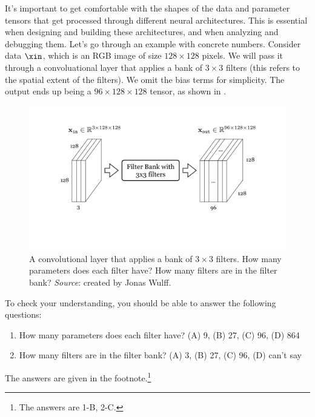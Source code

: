 It's important to get comfortable with the shapes of the data and parameter tensors that get processed through different neural architectures. This is essential when designing and building these architectures, and when analyzing and debugging them. Let's go through an example with concrete numbers. Consider data $\xin$, which is an RGB image of size $128 \times 128$ pixels. We will pass it through a convoluational layer that applies a bank of $3 \times 3$ filters (this refers to the spatial extent of the filters). We omit the bias terms for simplicity. The output ends up being a $96 \times 128 \times 128$ tensor, as shown in \fig{\ref{fig:convolutional_neural_nets:multichannel_conv_diagram}}.
\begin{figure}[h]
\centerline{
    \includegraphics[width=0.65\linewidth]{./figures/convolutional_neural_nets/multichannel_conv_diagram.pdf}}
    \caption{A convolutional layer that applies a bank of $3 \times 3$ filters. How many parameters does each filter have? How many filters are in the filter bank? \textit{Source}: created by Jonas Wulff.}
    \label{fig:convolutional_neural_nets:multichannel_conv_diagram}
\end{figure}

To check your understanding, you should be able to answer the following questions:
\begin{enumerate}
    \item How many parameters does each filter have? (A) 9, (B) 27, (C) 96, (D) 864
    \item How many filters are in the filter bank? (A) 3, (B) 27, (C) 96, (D) can't say
\end{enumerate}
The answers are given in the footnote.\footnote{The answers are 1-B, 2-C.}



